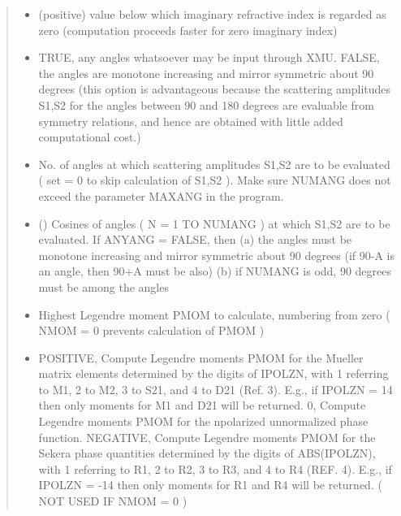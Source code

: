 \documentclass[letterpaper,10pt,english]{sphinxmanual}
\begin{document}
\begin{fulllineitems}
\begin{quote}
\begin{description}
\begin{itemize}
\item {} 
 \textendash{} (positive) value below which imaginary refractive
index is regarded as zero (computation proceeds
faster for zero imaginary index)

\item {} 
 \textendash{} TRUE, any angles whatsoever may be input through
XMU.  FALSE, the angles are monotone increasing
and mirror symmetric about 90 degrees (this option
is advantageous because the scattering amplitudes
S1,S2 for the angles between 90 and 180 degrees
are evaluable from symmetry relations, and hence
are obtained with little added computational cost.)

\item {} 
 \textendash{} No. of angles at which scattering amplitudes
S1,S2 are to be evaluated  ( set = 0 to skip
calculation of S1,S2 ).  Make sure NUMANG does
not exceed the parameter MAXANG in the program.

\item {} 
 () \textendash{} Cosines of angles ( N = 1 TO NUMANG ) at which S1,S2
are to be evaluated.  If ANYANG = FALSE, then
(a) the angles must be monotone increasing and
mirror symmetric about 90 degrees (if 90-A is
an angle, then 90+A must be also)
(b) if NUMANG is odd, 90 degrees must be among
the angles

\item {} 
 \textendash{} Highest Legendre moment PMOM to calculate,
numbering from zero ( NMOM = 0 prevents
calculation of PMOM )

\item {} 
 \textendash{} POSITIVE, Compute Legendre moments PMOM for the
Mueller matrix elements determined by the
digits of IPOLZN, with 1 referring to M1,
2 to M2, 3 to S21, and 4 to D21 (Ref. 3).
E.g., if IPOLZN = 14 then only moments for
M1 and D21 will be returned.
0,  Compute Legendre moments PMOM for the
npolarized unnormalized phase function.
NEGATIVE, Compute Legendre moments PMOM for the
Sekera phase quantities determined by the
digits of ABS(IPOLZN), with 1 referring to
R1, 2 to R2, 3 to R3, and 4 to R4 (REF. 4).
E.g., if IPOLZN = -14 then only moments for
R1 and R4 will be returned.
( NOT USED IF  NMOM = 0 )


\end{itemize}
\end{description}
\end{quote}
\end{fulllineitems}
\end{document}
